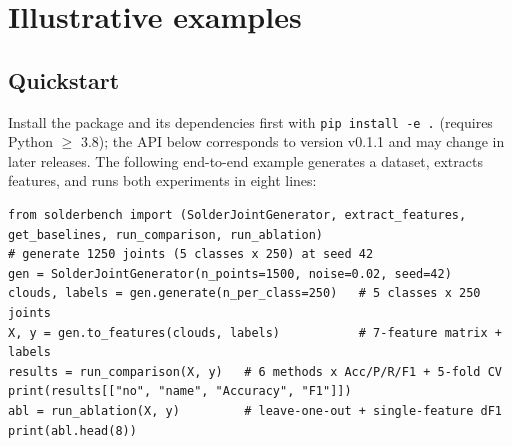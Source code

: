 \documentclass[3p]{elsarticle}
\begin{document}
\section{Illustrative examples}
\subsection{Quickstart}
Install the package and its dependencies first with \texttt{pip install -e .} (requires Python $\ge$ 3.8); the API below corresponds to version v0.1.1 and may change in later releases. The following end-to-end example generates a dataset, extracts features, and runs both experiments in eight lines:
{\footnotesize
\begin{verbatim}
from solderbench import (SolderJointGenerator, extract_features,
get_baselines, run_comparison, run_ablation)
# generate 1250 joints (5 classes x 250) at seed 42
gen = SolderJointGenerator(n_points=1500, noise=0.02, seed=42)
clouds, labels = gen.generate(n_per_class=250)   # 5 classes x 250 joints
X, y = gen.to_features(clouds, labels)           # 7-feature matrix + labels
results = run_comparison(X, y)   # 6 methods x Acc/P/R/F1 + 5-fold CV
print(results[["no", "name", "Accuracy", "F1"]])
abl = run_ablation(X, y)         # leave-one-out + single-feature dF1
print(abl.head(8))
\end{verbatim}
}
\end{document}
